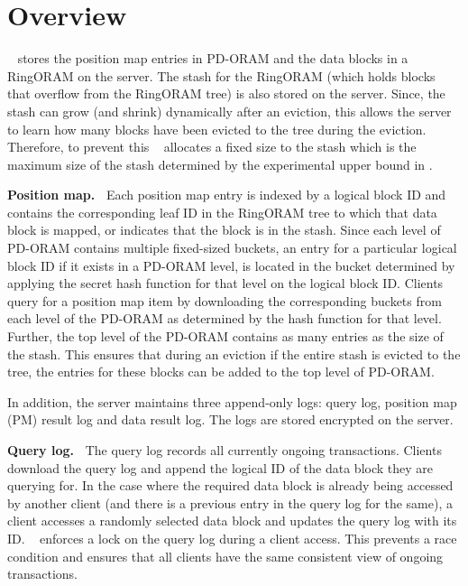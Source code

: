 \section{Overview}
\label{oram:overview}

\sysname~ stores the position map entries in PD-ORAM and the 
data blocks in a RingORAM on the server. The stash for the RingORAM (which 
holds blocks that overflow from the RingORAM tree) is also stored on the server. 
Since, the stash can grow (and shrink) dynamically after an eviction, this allows the server to learn 
how many blocks have been evicted to the tree during the eviction. Therefore, to prevent this \sysname~ 
allocates a fixed size to the stash which is the maximum size of the stash determined by the experimental 
upper bound in \cite{ringoram}.

{\bf Position map.~}
%
Each position map entry is indexed by a logical block ID and contains 
the corresponding leaf ID in the RingORAM tree to which that data block is mapped, or 
indicates that the block is in the stash. Since each level of PD-ORAM contains multiple fixed-sized buckets, 
an entry for a particular logical block ID if it exists in a PD-ORAM level, is located 
in the bucket determined by applying the secret hash function for that level on the 
logical block ID. Clients query for a position map item by downloading the corresponding buckets
from each level of the PD-ORAM as determined by the hash function for that level. 
Further, the top level of the PD-ORAM contains as many entries as the size of the stash. 
This ensures that during an eviction if the entire stash is evicted to the tree, the entries for these 
blocks can be added to the top level of PD-ORAM.

In addition, the server maintains 
three append-only logs: query log, position map (PM) result log 
and data result log. The logs are stored encrypted on the server.


{\bf Query log.~}
%
The query log records all currently ongoing transactions. Clients download
the query log and append the logical ID of the data block they are querying for. 
In the case where the required data block is already being accessed by another client (and there 
is a previous entry in the query log for the same), a 
client accesses a randomly selected data block 
and updates the query log with its ID. \sysname~ enforces a lock on the query log 
during a client access. This prevents a race condition and ensures that all 
clients have the same consistent view of ongoing transactions.

